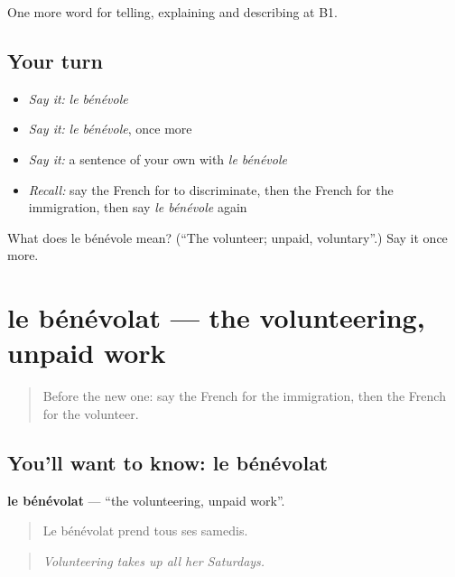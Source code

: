 \begin{grammarlens}[title={What you've built}]
One more word for telling, explaining and describing at B1.
\end{grammarlens}

\subsection*{Your turn}
\begin{itemize}
\raggedright
  \item \emph{Say it:} \emph{le bénévole}
  \item \emph{Say it:} \emph{le bénévole}, once more
  \item \emph{Say it:} a sentence of your own with \emph{le bénévole}
  \item \emph{Recall:} say the French for to discriminate, then the French for the immigration, then say \emph{le bénévole} again
\end{itemize}

\begin{tcolorbox}[breakable,colback=teal!4,colframe=teal!35!black,title={Before you move on}]
What does le bénévole mean? (\textquotedblleft{}The volunteer; unpaid, voluntary\textquotedblright{}.) Say it once more.
\end{tcolorbox}
\section[le bénévolat]{le bénévolat — the volunteering, unpaid work}

\label{lesson:FR-C366-benevolat}



\begin{quote}
Before the new one: say the French for the immigration, then the French for the volunteer.
\end{quote}

\subsection*{You'll want to know: le bénévolat}
\textbf{le bénévolat} — \textquotedblleft{}the volunteering, unpaid work\textquotedblright{}.

\begin{quote}
Le bénévolat prend tous ses samedis.
\end{quote}

\begin{quote}
\emph{Volunteering takes up all her Saturdays.}
\end{quote}

